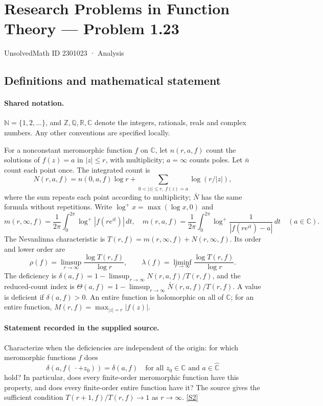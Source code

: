 \documentclass[11pt]{article}
\newcommand{\sref}[2]{\hyperlink{source:#1:#2}{[S#2]}}
\begin{document}
\setcounter{section}{2301022}
\section{Research Problems in Function Theory — Problem 1.23}\label{2301023}
{\small\sffamily UnsolvedMath ID 2301023 · Analysis}
\subsection{Definitions and mathematical statement}

\paragraph{Shared notation.}$\mathbb N=\{1,2,\ldots\}$, and $\mathbb Z,\mathbb Q,\mathbb R,\mathbb C$ denote the integers, rationals, reals and complex numbers. Any other conventions are specified locally.


For a nonconstant meromorphic function $f$ on $\mathbb C$, let $n(r,a,f)$ count the solutions of $f(z)=a$ in $|z|\le r$, with multiplicity; $a=\infty$ counts poles. Let $\bar n$ count each point once. The integrated count is
\[
 N(r,a,f)=n(0,a,f)\log r+\sum_{0<|z|\le r,\ f(z)=a}\log(r/|z|),
\]
where the sum repeats each point according to multiplicity; $\bar N$ has the same formula without repetitions. Write $\log^+x=\max(\log x,0)$ and
\[
 m(r,\infty,f)=\frac1{2\pi}\int_0^{2\pi}\log^+|f(re^{it})|\,dt,\quad
 m(r,a,f)=\frac1{2\pi}\int_0^{2\pi}\log^+\frac1{|f(re^{it})-a|}\,dt\quad(a\in\mathbb C).
\]
The Nevanlinna characteristic is $T(r,f)=m(r,\infty,f)+N(r,\infty,f)$. Its order and lower order are
\[
 \rho(f)=\limsup_{r\to\infty}\frac{\log T(r,f)}{\log r},\qquad
 \lambda(f)=\liminf_{r\to\infty}\frac{\log T(r,f)}{\log r}.
\]
The deficiency is $\delta(a,f)=1-\limsup_{r\to\infty}N(r,a,f)/T(r,f)$, and the reduced-count index is $\Theta(a,f)=1-\limsup_{r\to\infty}\bar N(r,a,f)/T(r,f)$. A value is deficient if $\delta(a,f)>0$. An entire function is holomorphic on all of $\mathbb C$; for an entire function, $M(r,f)=\max_{|z|=r}|f(z)|$.
\paragraph{Statement recorded in the supplied source.}
Characterize when the deficiencies are independent of the origin: for which meromorphic functions $f$ does
\[
 \delta(a,f(\,\cdot+z_0))=\delta(a,f)
 \quad\text{for all }z_0\in\mathbb C\text{ and }a\in\widehat{\mathbb C}
\]
hold? In particular, does every finite-order meromorphic function have this property, and does every finite-order entire function have it? The source gives the sufficient condition $T(r+1,f)/T(r,f)\to1$ as $r\to\infty$. \sref{2301023}{2}
\end{document}
